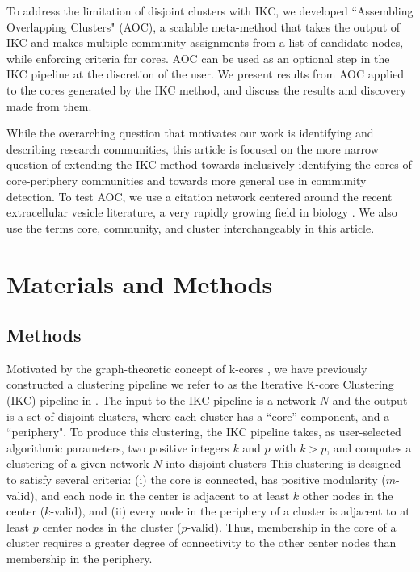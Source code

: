 \documentclass[12pt, oneside]{article}   	%
\begin{document}
	
To address the limitation of disjoint clusters with IKC, we developed  ``Assembling Overlapping Clusters" (AOC), a scalable meta-method that takes the output of IKC and makes multiple community assignments from a list of candidate nodes, while enforcing criteria for cores. AOC can be used as an optional step in the IKC pipeline at the discretion of the user. We present results from AOC applied to the cores generated by the IKC method, and discuss the results and discovery made from them. 
	
While the overarching question that motivates our work is identifying and describing research communities, this article is focused on the more narrow question of extending the IKC method towards inclusively identifying the cores of core-periphery communities and towards more general use in community detection. To test AOC, we use a citation network centered around the recent extracellular vesicle literature, a very rapidly growing field in biology \citep{van2022challenges}. We also use the terms core, community, and cluster interchangeably in this article.

\section{Materials and Methods}
	
\subsection{Methods} Motivated by the graph-theoretic concept of k-cores \citep{Giatsidis2011,malliaros2019}, we have previously constructed a clustering pipeline we refer to as  the Iterative K-core Clustering (IKC) pipeline in \cite{Wedell2022}. The input to the IKC pipeline is a network $N$ and the output is a set of disjoint clusters, where each cluster has a ``core'' component, and a ``periphery".  To produce this clustering,
the IKC pipeline takes, as user-selected algorithmic parameters, two positive integers $k$ and $p$ with $k > p$, and computes a clustering of a given network $N$ into disjoint clusters 
This clustering is designed to satisfy several criteria: (i) the core is connected,  has positive modularity ($m$-valid), and each node in the center  is adjacent to at least $k$ other nodes in the center ($k$-valid), and (ii) every node in the periphery of a cluster is adjacent to at least $p$ center nodes in the cluster ($p$-valid). Thus, membership in the core of a cluster requires a greater degree of connectivity to the other center nodes than membership in the periphery. 
\end{document}
